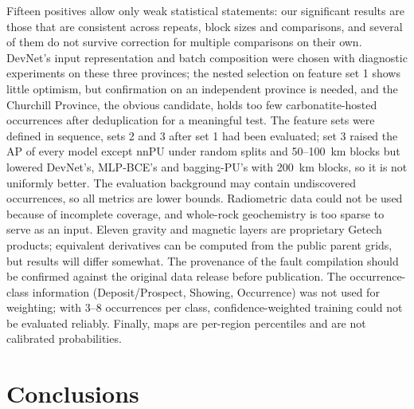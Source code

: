 \documentclass[pdflatex,sn-apa]{sn-jnl}
\begin{document}
Fifteen positives allow only weak statistical statements: our significant results are those that are consistent across repeats, block sizes and comparisons, and several of them do not survive correction for multiple comparisons on their own. DevNet's input representation and batch composition were chosen with diagnostic experiments on these three provinces; the nested selection on feature set 1 shows little optimism, but confirmation on an independent province is needed, and the Churchill Province, the obvious candidate, holds too few carbonatite-hosted occurrences after deduplication for a meaningful test. The feature sets were defined in sequence, sets 2 and 3 after set 1 had been evaluated; set 3 raised the AP of every model except nnPU under random splits and 50--100~km blocks but lowered DevNet's, MLP-BCE's and bagging-PU's with 200~km blocks, so it is not uniformly better. The evaluation background may contain undiscovered occurrences, so all metrics are lower bounds. Radiometric data could not be used because of incomplete coverage, and whole-rock geochemistry is too sparse to serve as an input. Eleven gravity and magnetic layers are proprietary Getech products; equivalent derivatives can be computed from the public parent grids, but results will differ somewhat. The provenance of the fault compilation should be confirmed against the original data release before publication. The occurrence-class information (Deposit/Prospect, Showing, Occurrence) was not used for weighting; with 3--8 occurrences per class, confidence-weighted training could not be evaluated reliably. Finally, maps are per-region percentiles and are not calibrated probabilities.

\section{Conclusions}\label{sec:conclusions}
\end{document}

